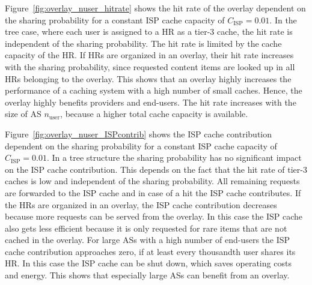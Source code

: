 Figure~\ref{fig:overlay_nuser_hitrate} shows the hit rate of the overlay dependent on the sharing probability for a constant ISP cache capacity of $C_\text{ISP}=0.01$. In the tree case, where each user is assigned to a HR as a tier-3 cache, the hit rate is independent of the sharing probability. The hit rate is limited by the cache capacity of the HR. If HRs are organized in an overlay, their hit rate increases with the sharing probability, since requested content items are looked up in all HRs belonging to the overlay. This shows that an overlay highly increases the performance of a caching system with a high number of small caches. Hence, the overlay highly benefits providers and end-users. The hit rate increases with the size of AS $n_\text{user}$, because a higher total cache capacity is available.




Figure~\ref{fig:overlay_nuser_ISPcontrib} shows the ISP cache contribution dependent on the sharing probability for a constant ISP cache capacity of $C_\text{ISP}=0.01$. In a tree structure the sharing probability has no significant impact on the ISP cache contribution. This depends on the fact that the hit rate of tier-3 caches is low and independent of the sharing probability. All remaining requests are forwarded to the ISP cache and in case of a hit the ISP cache contributes. If the HRs are organized in an overlay, the ISP cache contribution decreases because more requests can be served from the overlay. In this case the ISP cache also gets less efficient because it is only requested for rare items that are not cached in the overlay.
For large ASs with a high number of end-users the ISP cache contribution approaches zero, if at least every thousandth user shares its HR. In this case the ISP cache can be shut down, which saves operating costs and energy. This shows that especially large ASs can benefit from an overlay.

